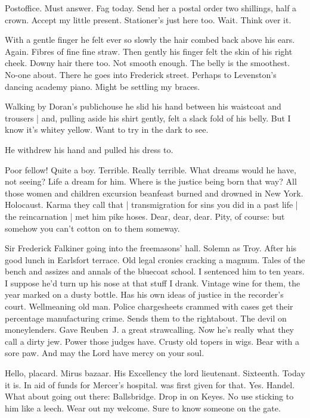 Postoffice.
Must answer.
Fag today.
Send her a postal order
two shillings, half a crown.
Accept my little present.
Stationer's just here too.
Wait.
Think over it.

With a gentle finger
he felt ever so slowly the hair combed back above his ears.
Again.
Fibres of fine fine straw.
Then gently his finger felt
the skin of his right cheek.
Downy hair there too.
Not smooth enough.
The belly is the smoothest.
No-one about.
There he goes into Frederick street.
Perhaps to Levenston's dancing academy piano.
Might be settling my braces.

Walking by Doran's publichouse
he slid his hand between his waistcoat and trousers |
and, pulling aside his shirt gently,
felt a slack fold of his belly.
But I know it's whitey yellow.
Want to try in the dark to see.

He withdrew his hand and pulled his dress to.

Poor fellow!
Quite a boy.
Terrible.
Really terrible.
What dreams would he have,
not seeing?
Life a dream for him.
Where is the justice being born that way?
All those women and children excursion beanfeast burned and drowned in New York.
Holocaust.
Karma they call that |
transmigration for sins you did in a past life |
the reincarnation |
met him pike hoses.
Dear, dear, dear.
Pity, of course:
but somehow you can't cotton on to them someway.%

Sir Frederick Falkiner going into the freemasons' hall.
Solemn as Troy.
After his good lunch in Earlsfort terrace.
Old legal cronies cracking a magnum.
Tales of the bench and assizes and annals of the bluecoat school.
I sentenced him to ten years.
I suppose he'd turn up his nose at that stuff I drank.
Vintage wine for them,
the year marked on a dusty bottle.
Has his own ideas of justice in the recorder's court.
Wellmeaning old man.
Police chargesheets crammed with cases get their percentage manufacturing crime.
Sends them to the rightabout.
The devil on moneylenders.
Gave Reuben~J. a great strawcalling.
Now he's really what they call a dirty jew.
Power those judges have.
Crusty old topers in wigs.
Bear with a sore paw.
And may the Lord have mercy on your soul.

Hello, placard.
Mirus bazaar.
His Excellency the lord lieutenant.
Sixteenth.
Today it is.
In aid of funds for Mercer's hospital.
 was first given for that.
Yes.
Handel.
What about going out there:
Ballsbridge.
Drop in on Keyes.
No use sticking to him like a leech.
Wear out my welcome.
Sure to know someone on the gate.

